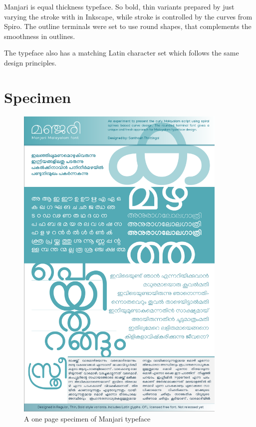\documentclass[11pt,twoside,a4paper,parskip=half]{scrartcl}
\begin{document}
Manjari is equal thickness typeface. So bold, thin variants prepared by just varying the stroke with in Inkscape, while stroke is controlled by the curves from Spiro. The outline terminals were set to use round shapes, that complements the smoothness in outlines.

The typeface also has a matching Latin character set which follows the same design principles.
\clearpage
\section{Specimen}


\begin{figure}[h!]
\includegraphics[width=0.9\textwidth]{images/Manjari-Specimen.pdf}
	\caption{A one page specimen of Manjari typeface}
\label{specimen}
\end{figure}

\clearpage
\end{document}
